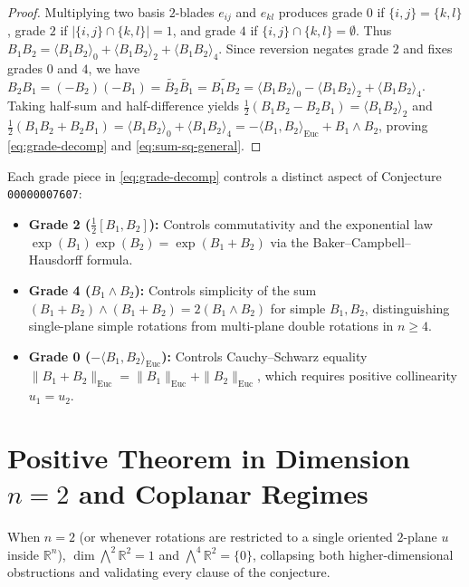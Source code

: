 \documentclass[11pt]{article}
\theoremstyle{definition}
\newcommand{\Euc}{\mathrm{Euc}}
\newcommand{\rev}[1]{\widetilde{#1}}
\newcommand{\grade}[2]{\langle #1 \rangle_{#2}}
\begin{document}
\begin{proof}
Multiplying two basis $2$-blades $e_{ij}$ and $e_{kl}$ produces grade $0$ if $\{i,j\}=\{k,l\}$,
grade $2$ if $|\{i,j\} \cap \{k,l\}| = 1$, and grade $4$ if $\{i,j\} \cap \{k,l\} = \emptyset$.
Thus $B_1 B_2 = \grade{B_1 B_2}{0} + \grade{B_1 B_2}{2} + \grade{B_1 B_2}{4}$. Since reversion
negates grade $2$ and fixes grades $0$ and $4$, we have
$B_2 B_1 = (-B_2)(-B_1) = \rev{B_2}\rev{B_1} = \rev{B_1 B_2}
= \grade{B_1 B_2}{0} - \grade{B_1 B_2}{2} + \grade{B_1 B_2}{4}$.
Taking half-sum and half-difference yields $\frac{1}{2}(B_1 B_2 - B_2 B_1) = \grade{B_1 B_2}{2}$
and $\frac{1}{2}(B_1 B_2 + B_2 B_1) = \grade{B_1 B_2}{0} + \grade{B_1 B_2}{4}
= -\langle B_1, B_2 \rangle_{\Euc} + B_1 \wedge B_2$, proving \eqref{eq:grade-decomp} and
\eqref{eq:sum-sq-general}.
\end{proof}

Each grade piece in \eqref{eq:grade-decomp} controls a distinct aspect of Conjecture
\texttt{00000007607}:
\begin{itemize}
  \item \textbf{Grade 2 ($\frac{1}{2}[B_1, B_2]$):} Controls commutativity and the exponential
    law $\exp(B_1)\exp(B_2) = \exp(B_1 + B_2)$ via the Baker--Campbell--Hausdorff formula.
  \item \textbf{Grade 4 ($B_1 \wedge B_2$):} Controls simplicity of the sum $(B_1 + B_2) \wedge
    (B_1 + B_2) = 2(B_1 \wedge B_2)$ for simple $B_1, B_2$, distinguishing single-plane simple
    rotations from multi-plane double rotations in $n \ge 4$.
  \item \textbf{Grade 0 ($-\langle B_1, B_2 \rangle_{\Euc}$):} Controls Cauchy--Schwarz equality
    $\|B_1 + B_2\|_{\Euc} = \|B_1\|_{\Euc} + \|B_2\|_{\Euc}$, which requires positive collinearity
    $u_1 = u_2$.
\end{itemize}

\section{Positive Theorem in Dimension \texorpdfstring{$n = 2$}{n = 2} and Coplanar Regimes}

When $n = 2$ (or whenever rotations are restricted to a single oriented $2$-plane $u$ inside
$\mathbb{R}^n$), $\dim \bigwedge^2 \mathbb{R}^2 = 1$ and $\bigwedge^4 \mathbb{R}^2 = \{0\}$,
collapsing both higher-dimensional obstructions and validating every clause of the conjecture.
\end{document}
